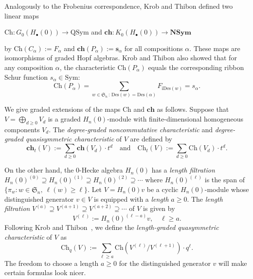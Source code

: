 \documentclass[ALCO,ThmDefs,published]{cedram}
\newcommand{\symm}{{\mathfrak{S}}}
\theoremstyle{plain}
\newcommand{\Des}{{\mathrm {Des}}}
\newcommand{\NSym}{{\mathbf {NSym}}}
\newcommand{\Sym}{{\mathrm {Sym}}}
\newcommand{\QSym}{{\mathrm {QSym}}}
\newcommand{\Ch}{{\mathrm {Ch}}}
\newcommand{\ch}{{\mathbf {ch}}}
\newcommand{\iDes}{{\mathrm {iDes}}}
\newcommand{\symm}{{\mathfrak{S}}}
\newcommand{\sss}{{\mathbf{s}}}
\begin{document}
Analogously to the Frobenius correspondence, Krob and Thibon \cite{KT} defined two linear maps
\begin{center}
$\Ch: G_0(H_{\bullet}(0)) \rightarrow \QSym$ and $\ch: K_0(H_{\bullet}(0)) \rightarrow \NSym$
\end{center}
by $\Ch(C_{\alpha}) := F_{\alpha}$ and $\ch(P_{\alpha}) := \sss_{\alpha}$ for all compositions $\alpha$.  These maps
are isomorphisms of graded Hopf algebras.  
Krob and Thibon also showed \cite{KT} that for any composition $\alpha$, 
the characteristic $\Ch(P_\alpha)$ equals the corresponding ribbon Schur function $s_{\alpha} \in \Sym$:
\begin{equation}
\label{ChP}
\Ch(P_{\alpha}) =  \sum_{w \in \symm_n \,:\, \Des(w) = \Des(\alpha)} F_{\iDes(w)} = s_{\alpha}.
\end{equation}


We give graded extensions of the maps $\Ch$ and $\ch$ as follows.  
Suppose that $V = \bigoplus_{d \geq 0} V_d$ is a graded $H_n(0)$-module with finite-dimensional homogeneous components $V_d$.
The \emph{degree-graded noncommutative characteristic} and \emph{degree-graded quasisymmetric characteristic} of $V$ are defined by
\begin{equation}
\ch_t(V) := \sum_{d \geq 0} \ch(V_d) \cdot t^d
\quad\text{and}\quad
\Ch_t(V) := \sum_{d \geq 0} \Ch(V_d) \cdot t^d.
\end{equation}

On the other hand, the 0-Hecke algebra $H_n(0)$ has a \emph{length filtration}
$H_n(0)^{(0)} \supseteq H_n(0)^{(1)} \supseteq H_n(0)^{(2)} \supseteq \cdots$ 
where $H_n(0)^{(\ell)}$ is the span of $\{ \pi_w: w \in \symm_n,\ \ell(w) \ge \ell \}$.
Let $V = H_n(0)v$ be a cyclic $H_n(0)$-module whose distinguished generator $v \in V$ 
is equipped with a \emph{length} $a \geq 0$.  
The \emph{length filtration} $V^{(a)} \supseteq V^{(a+1)} \supseteq V^{(a+2)} \supseteq \cdots $ of $V$ is given by
\begin{equation}
V^{(\ell)} := H_n(0)^{(\ell-a)} v, \quad \ell \geq a.
\end{equation}
Following Krob and Thibon~\cite{KT}, we define the \emph{length-graded quasymmetric characteristic} of $V$ as
\begin{equation}
\Ch_q(V) := \sum_{\ell \geq a}  \Ch \left( {V^{(\ell)}} \big/ {V^{(\ell+1)}} \right) \cdot q^{\ell}.
\end{equation}
The freedom to choose a length  $a \geq 0$ for the distinguished generator $v$ will make certain
formulas look nicer.
\end{document}
